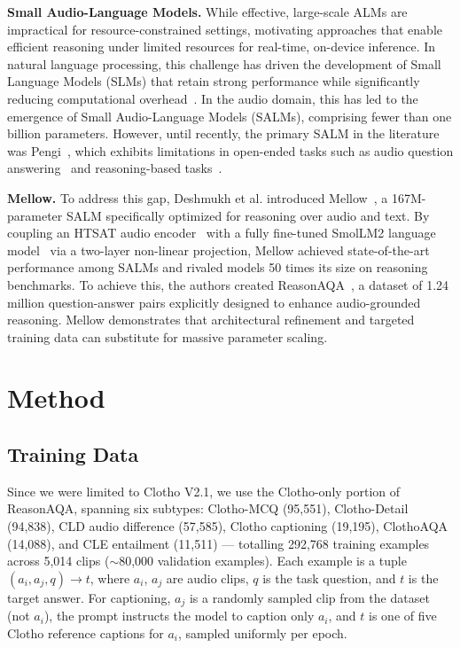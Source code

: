 \documentclass[cameraready]{Interspeech}
\begin{document}
\medskip
\noindent\textbf{Small Audio-Language Models.} While effective, large-scale ALMs are impractical for resource-constrained settings, motivating approaches that enable efficient reasoning under limited resources for real-time, on-device inference. In natural language processing, this challenge has driven the development of Small Language Models (SLMs) that retain strong performance while significantly reducing computational overhead~\cite{smollm2, abdin2024phi3, liu2024mobilellm}. In the audio domain, this has led to the emergence of Small Audio-Language Models (SALMs), comprising fewer than one billion parameters. However, until recently, the primary SALM in the literature was Pengi~\cite{deshmukh2023pengi}, which exhibits limitations in open-ended tasks such as audio question answering~\cite{gong2024listen} and reasoning-based tasks~\cite{deshmukh2024audio, deshmukh2025adiff, sakshi2024mmau}.

\medskip
\noindent\textbf{Mellow.} To address this gap, Deshmukh et al. introduced Mellow~\cite{mellow}, a 167M-parameter SALM specifically optimized for reasoning over audio and text. By coupling an HTSAT audio encoder~\cite{chen2022HTSAT} with a fully fine-tuned SmolLM2 language model~\cite{smollm2} via a two-layer non-linear projection, Mellow achieved state-of-the-art performance among SALMs and rivaled models 50 times its size on reasoning benchmarks. To achieve this, the authors created ReasonAQA~\cite{mellow}, a dataset of 1.24 million question-answer pairs explicitly designed to enhance audio-grounded reasoning. Mellow demonstrates that architectural refinement and targeted training data can substitute for massive parameter scaling.



\section{Method}
\label{sec:method}

\subsection{Training Data}

Since we were limited to Clotho V2.1, we use the Clotho-only portion of ReasonAQA, spanning six subtypes: Clotho-MCQ (95,551), Clotho-Detail (94,838), CLD audio difference (57,585), Clotho captioning (19,195), ClothoAQA (14,088), and CLE entailment (11,511) — totalling 292,768 training examples across 5,014 clips ($\sim$80,000 validation examples). Each example is a tuple $(a_i, a_j, q) \to t$, where $a_i$, $a_j$ are audio clips, $q$ is the task question, and $t$ is the target answer. For captioning, $a_j$ is a randomly sampled clip from the dataset (not $a_i$), the prompt instructs the model to caption only $a_i$, and $t$ is one of five Clotho reference captions for $a_i$, sampled uniformly per epoch.
\end{document}
